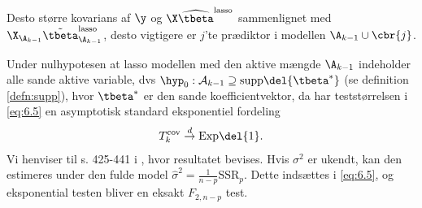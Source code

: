 Desto større kovarians af \(\y\) og \(\X \widehat{\tbeta}^\text{lasso}\) sammenlignet med \(\X_{\A_{k-1}} \tilde{\tbeta}^\text{lasso}_{\A_{k-1}}\), desto vigtigere er \(j\)'te prædiktor i modellen \(\A_{k-1} \cup \cbr{j}\).

Under nulhypotesen at lasso modellen med den aktive mængde \(\A_{k-1}\) indeholder alle sande aktive variable, dvs \(\hyp_0: \mathcal{A}_{k-1} \supseteq \text{supp} \del{\tbeta^*}\) (se definition \ref{defn:supp}), hvor \(\tbeta^*\) er den sande koefficientvektor, da har teststørrelsen i \eqref{eq:6.5} en asymptotisk standard eksponentiel fordeling
\begin{align*}
T_k^\text{cov} \overset{d}{\rightarrow} \text{Exp}\del{1}.
\end{align*}
Vi henviser til s. 425-441 i \citep{lockhart}, hvor resultatet bevises. 
Hvis \(\sigma^2\) er ukendt, kan den estimeres under den fulde model \(\widehat{\sigma}^2 = \frac{1}{n-p} \text{SSR}_p\). 
Dette indsættes i \eqref{eq:6.5}, og eksponential testen bliver en eksakt \(F_{2,n-p}\) test. \\
%
